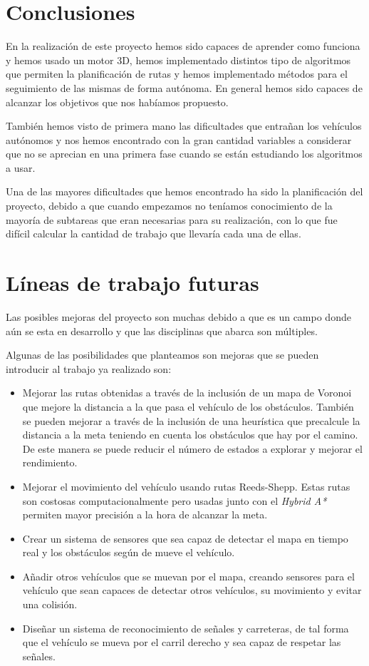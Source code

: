 
\section{Conclusiones}
En la realización de este proyecto hemos sido capaces de aprender como funciona y hemos usado un motor 3D, hemos implementado distintos tipo de algoritmos que permiten la planificación de rutas y hemos implementado métodos para el seguimiento de las mismas de forma autónoma. En general hemos sido capaces de alcanzar los objetivos que nos habíamos propuesto.

También hemos visto de primera mano las dificultades que entrañan los vehículos autónomos y nos hemos encontrado con la gran cantidad variables a considerar que no se aprecian en una primera fase cuando se están estudiando los algoritmos a usar.

Una de las mayores dificultades que hemos encontrado ha sido la planificación del proyecto, debido a que cuando empezamos no teníamos conocimiento de la mayoría de subtareas que eran necesarias para su realización, con lo que fue difícil calcular la cantidad de trabajo que llevaría cada una de ellas.

\section{Líneas de trabajo futuras}
Las posibles mejoras del proyecto son muchas debido a que es un campo donde aún se esta en desarrollo y que las disciplinas que abarca son múltiples.

Algunas de las posibilidades que planteamos son mejoras que se pueden introducir al trabajo ya realizado son:
\begin{itemize}
\item Mejorar las rutas obtenidas a través de la inclusión de un mapa de Voronoi que mejore la distancia a la que pasa el vehículo de los obstáculos. También se pueden mejorar a través de la inclusión de una heurística que precalcule la distancia a la meta teniendo en cuenta los obstáculos que hay por el camino. De este manera se puede reducir el número de estados a explorar y mejorar el rendimiento.
\item Mejorar el movimiento del vehículo usando rutas Reeds-Shepp. Estas rutas son costosas computacionalmente pero usadas junto con el \textit{Hybrid A*} permiten mayor precisión a la hora de alcanzar la meta.
\item Crear un sistema de sensores que sea capaz de detectar el mapa en tiempo real y los obstáculos según de mueve el vehículo.
\item Añadir otros vehículos que se muevan por el mapa, creando sensores para el vehículo que sean capaces de detectar otros vehículos, su movimiento y evitar una colisión.
\item Diseñar un sistema de reconocimiento de señales y carreteras, de tal forma que el vehículo se mueva por el carril derecho y sea capaz de respetar las señales.
\end{itemize}
